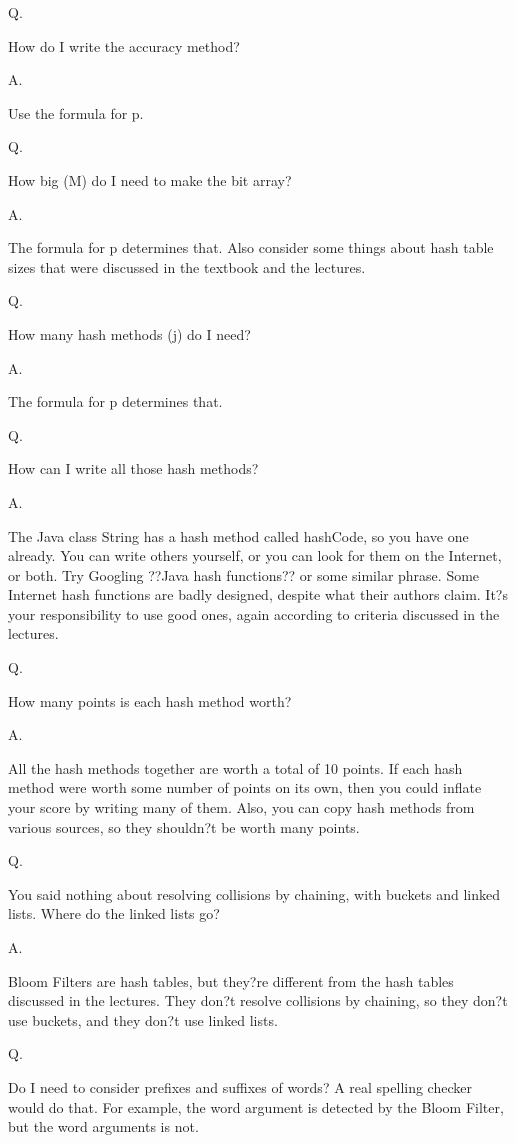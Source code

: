 Q.  

How do I write the accuracy method?

A.  

Use the formula for p.

Q.  

How big (M) do I need to make the bit array?

A.  

The formula for p determines that. Also consider some things about hash table sizes that were discussed in the textbook and the lectures.

Q.  

How many hash methods (j) do I need?

A.  

The formula for p determines that.

Q.  

How can I write all those hash methods?

A.  

The Java class String has a hash method called hashCode, so you have one already. You can write others yourself, or you can look for them on the Internet, or both. Try Googling ??Java hash functions?? or some similar phrase. Some Internet hash functions are badly designed, despite what their authors claim. It?s your responsibility to use good ones, again according to criteria discussed in the lectures.

Q.  

How many points is each hash method worth?

A.  

All the hash methods together are worth a total of 10 points. If each hash method were worth some number of points on its own, then you could inflate your score by writing many of them. Also, you can copy hash methods from various sources, so they shouldn?t be worth many points.

Q.  

You said nothing about resolving collisions by chaining, with buckets and linked lists. Where do the linked lists go?

A.  

Bloom Filters are hash tables, but they?re different from the hash tables discussed in the lectures. They don?t resolve collisions by chaining, so they don?t use buckets, and they don?t use linked lists.

Q.  

Do I need to consider prefixes and suffixes of words? A real spelling checker would do that. For example, the word argument is detected by the Bloom Filter, but the word arguments is not.

